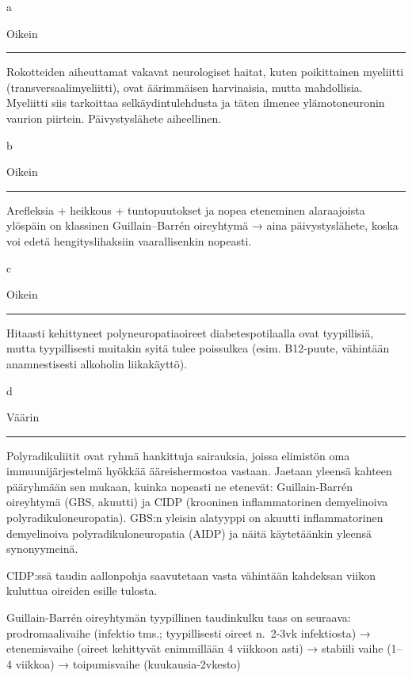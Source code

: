 \documentclass[
]{book}
\begin{document}
a

Oikein

\begin{center}\rule{0.5\linewidth}{0.5pt}\end{center}

Rokotteiden aiheuttamat vakavat neurologiset haitat, kuten poikittainen myeliitti (transversaalimyeliitti), ovat äärimmäisen harvinaisia, mutta mahdollisia. Myeliitti siis tarkoittaa selkäydintulehdusta ja täten ilmenee ylämotoneuronin vaurion piirtein. Päivystyslähete aiheellinen.

b

Oikein

\begin{center}\rule{0.5\linewidth}{0.5pt}\end{center}

Arefleksia + heikkous + tuntopuutokset ja nopea eteneminen alaraajoista ylöspäin on klassinen Guillain--Barrén oireyhtymä → aina päivystyslähete, koska voi edetä hengityslihaksiin vaarallisenkin nopeasti.

c

Oikein

\begin{center}\rule{0.5\linewidth}{0.5pt}\end{center}

Hitaasti kehittyneet polyneuropatiaoireet diabetespotilaalla ovat tyypillisiä, mutta tyypillisesti muitakin syitä tulee poissulkea (esim. B12-puute, vähintään anamnestisesti alkoholin liikakäyttö).

d

Väärin

\begin{center}\rule{0.5\linewidth}{0.5pt}\end{center}

Polyradikuliitit ovat ryhmä hankittuja sairauksia, joissa elimistön oma immuunijärjestelmä hyökkää ääreishermostoa vastaan. Jaetaan yleensä kahteen pääryhmään sen mukaan, kuinka nopeasti ne etenevät: Guillain-Barrén oireyhtymä (GBS, akuutti) ja CIDP (krooninen inflammatorinen demyelinoiva polyradikuloneuropatia). GBS:n yleisin alatyyppi on akuutti inflammatorinen demyelinoiva polyradikuloneuropatia (AIDP) ja näitä käytetäänkin yleensä synonyymeinä.

CIDP:ssä taudin aallonpohja saavutetaan vasta vähintään kahdeksan viikon kuluttua oireiden esille tulosta.

Guillain-Barrén oireyhtymän tyypillinen taudinkulku taas on seuraava: prodromaalivaihe (infektio tms.; tyypillisesti oireet n.~2-3vk infektiosta) → etenemisvaihe (oireet kehittyvät enimmillään 4 viikkoon asti) → stabiili vaihe (1--4 viikkoa) → toipumisvaihe (kuukausia-2vkesto)
\end{document}
